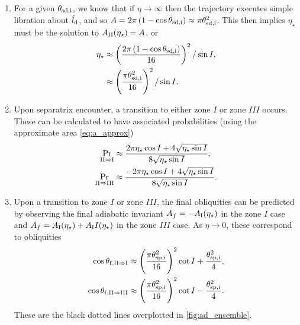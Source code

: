 \documentclass[
        fleqn,
        usenatbib,
        referee,
    ]{mnras}
\newcommand*{\p}[1]{\left(#1\right)}
\begin{document}
\begin{enumerate}
    \item For a given $\theta_{\rm sd, i}$, we know that if $\eta \to \infty$
        then the trajectory executes simple libration about $\hat{l}_{\rm d}$,
        and so $A = 2\pi\p{1 - \cos \theta_{\rm sd, i}} \approx \pi \theta_{\rm
        sd, i}^2$. This then implies $\eta_\star$ must be the solution to
        $A_{\rm II}(\eta_\star) = A$, or
        \begin{align}
            \eta_\star &\approx \p{\frac{2\pi\p{1 - \cos \theta_{\rm sd,i}}}{
                        16}}^2 / \sin I,\\
                    &\approx \p{\frac{\pi \theta_{\rm sd, i}^2}{16}}^2/\sin I.
        \end{align}

    \item Upon separatrix encounter, a transition to either zone $I$ or zone
        $III$ occurs. These can be calculated to have associated probabilities
        (using the approximate area \autoref{eq:a_approx})
        \begin{subequations}
            \begin{align}
                \Pr_{\rm II \Rightarrow I} &\approx \frac{2\pi
                    \eta_{\star} \cos I + 4\sqrt{\eta_{\star}\sin
                    I}}{8\sqrt{\eta_{\star}\sin I}},\\
                \Pr_{\rm II \Rightarrow III} &\approx \frac{-2\pi
                    \eta_{\star} \cos I + 4\sqrt{\eta_{\star}\sin
                    I}}{8\sqrt{\eta_{\star}\sin I}}.
            \end{align}
        \end{subequations}

    \item Upon a transition to zone $I$ or zone $III$, the final obliquities can
        be predicted by observing the final adiabatic invariant $A_f = -A_{\rm
        I}(\eta_\star)$ in the zone $I$ case and $A_f = A_{\rm I}(\eta_\star) +
        A_{\rm I}I(\eta_\star)$ in the zone $III$ case. As $\eta \to 0$, these
        correspond to obliquities
        \begin{subequations}\label{se:q_f_approx}
            \begin{align}
                \cos \theta_{\rm f, II \Rightarrow I} &\approx
                    \p{\frac{\pi \theta_{\rm sp, i}^2}{16}}^2 \cot I
                        + \frac{\theta_{\rm sp, i}^2}{4},\\
                \cos \theta_{\rm f, II \Rightarrow III} &\approx
                    \p{\frac{\pi \theta_{\rm sp, i}^2}{16}}^2 \cot I
                        - \frac{\theta_{\rm sp, i}^2}{4}.
            \end{align}
        \end{subequations}
        These are the black dotted lines overplotted in
        \autoref{fig:ad_ensemble}.
\end{enumerate}
\end{document}
